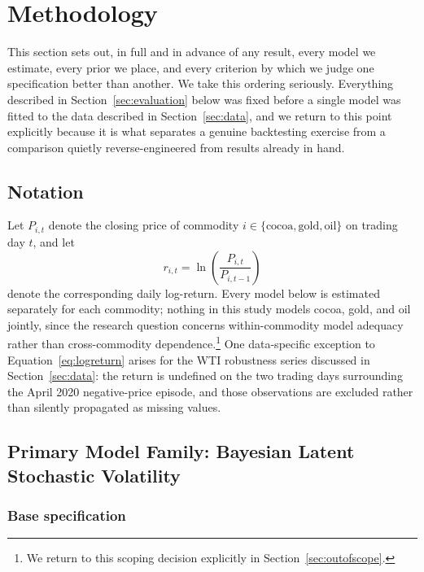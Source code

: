 \documentclass[preprint,12pt,authoryear]{elsarticle}
\begin{document}
\section{Methodology}
\label{sec:methodology}

This section sets out, in full and in advance of any result, every model we estimate, every prior we place, and every criterion by which we judge one specification better than another. We take this ordering seriously. Everything described in Section~\ref{sec:evaluation} below was fixed before a single model was fitted to the data described in Section~\ref{sec:data}, and we return to this point explicitly because it is what separates a genuine backtesting exercise from a comparison quietly reverse-engineered from results already in hand.

\subsection{Notation}

Let $P_{i,t}$ denote the closing price of commodity $i \in \{\text{cocoa}, \text{gold}, \text{oil}\}$ on trading day $t$, and let
\begin{equation}
  r_{i,t} = \ln\!\left(\frac{P_{i,t}}{P_{i,t-1}}\right)
  \label{eq:logreturn}
\end{equation}
denote the corresponding daily log-return. Every model below is estimated separately for each commodity; nothing in this study models cocoa, gold, and oil jointly, since the research question concerns within-commodity model adequacy rather than cross-commodity dependence.\footnote{We return to this scoping decision explicitly in Section~\ref{sec:outofscope}.} One data-specific exception to Equation~\ref{eq:logreturn} arises for the WTI robustness series discussed in Section~\ref{sec:data}: the return is undefined on the two trading days surrounding the April 2020 negative-price episode, and those observations are excluded rather than silently propagated as missing values.

\subsection{Primary Model Family: Bayesian Latent Stochastic Volatility}
\label{sec:sv}

\subsubsection{Base specification}
\end{document}
